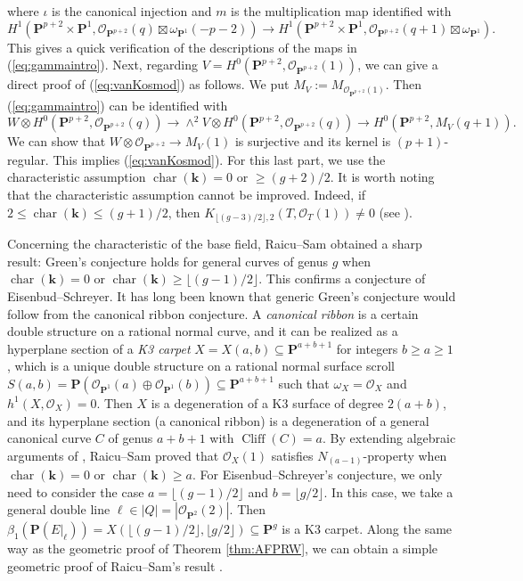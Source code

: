 \documentclass[graybox]{svmult}
\newcommand{\kk}{\mathbf{k}}
\newcommand{\sO}{\mathscr{O}}
\def\nP{\mathbf{P}}
\DeclareMathOperator{\Cliff}{Cliff}
\begin{document}
\noindent where $\iota$ is the canonical injection and $m$ is the multiplication map identified with
$$
H^1(\nP^{p+2} \times \nP^1, \sO_{\nP^{p+2}}(q) \boxtimes \omega_{\nP^1}(-p-2)) \longrightarrow H^1(\nP^{p+2} \times \nP^1, \sO_{\nP^{p+2}}(q+1) \boxtimes \omega_{\nP^1}).
$$
This gives a quick verification of the descriptions of the maps in (\ref{eq:gammaintro}). Next, regarding $V=H^0(\nP^{p+2}, \sO_{\nP^{p+2}}(1))$, we can give a direct proof of (\ref{eq:vanKosmod}) as follows.
We put $M_V:=M_{\sO_{\nP^{p+2}}(1)}$. Then (\ref{eq:gammaintro}) can be identified with
$$
W \otimes H^0(\nP^{p+2}, \sO_{\nP^{p+2}}(q)) \longrightarrow \wedge^2 V  \otimes H^0(\nP^{p+2}, \sO_{\nP^{p+2}}(q)) \longrightarrow H^0(\nP^{p+2}, M_V(q+1)).
$$
We can show that $W \otimes \sO_{\nP^{p+2}} \to M_V(1)$ is surjective and its kernel is $(p+1)$-regular. This implies (\ref{eq:vanKosmod}). For this last part, we use the characteristic assumption $\operatorname{char}(\kk) = 0$ or $\geq (g+2)/2$.
It is worth noting that the characteristic assumption cannot be improved. Indeed, if $2 \leq \operatorname{char}(\kk) \leq (g+1)/2$, then $K_{\lfloor (g-3)/2 \rfloor, 2}(T, \sO_T(1)) \neq 0$ (see \cite[Remark 5.17]{AFPRW}).

Concerning the characteristic of the base field, Raicu--Sam \cite[Theorem 1.5]{RS} obtained a sharp result: Green's conjecture holds for general curves of genus $g$ when $\operatorname{char}(\kk) = 0$ or $\operatorname{char}(\kk) \geq \lfloor(g-1)/2 \rfloor$. This confirms a conjecture of Eisenbud--Schreyer. 
It has long been known that generic Green's conjecture would follow from the canonical ribbon conjecture. A \emph{canonical ribbon} is a certain double structure on a rational normal curve, and it can be realized as a hyperplane section of a \emph{K3 carpet} $X=X(a,b) \subseteq \nP^{a+b+1}$ for integers $b \geq a \geq 1$, which is a unique double structure on a rational normal surface scroll $S(a,b)=\nP (\sO_{\nP^1}(a) \oplus \sO_{\nP^1}(b)) \subseteq \nP^{a+b+1}$ such that $\omega_X = \sO_X$ and $h^1(X, \sO_X)=0$. Then $X$ is a degeneration of a K3 surface of degree $2(a+b)$, and its hyperplane section (a canonical ribbon) is a degeneration of a general canonical curve $C$ of genus $a+b+1$ with $\Cliff(C) = a$. By extending algebraic arguments of \cite{AFPRW}, Raicu--Sam  \cite[Theorem 1.1]{RS} proved that $\sO_X(1)$ satisfies $N_{(a-1)}$-property when  $\operatorname{char}(\kk) = 0$ or $\operatorname{char}(\kk) \geq a$. For Eisenbud--Schreyer's conjecture, we only need to consider the case $a=\lfloor (g-1)/2 \rfloor$ and $b=\lfloor g/2 \rfloor$. In this case, we take a general double line $\ell \in |Q|=|\sO_{\nP^2}(2)|$. Then $\beta_1(\nP(E|_{\ell}))=X(\lfloor (g-1)/2 \rfloor, \lfloor g/2 \rfloor)  \subseteq \nP^g$ is a K3 carpet. Along the same way as the geometric proof of Theorem \ref{thm:AFPRW}, we can obtain a simple geometric proof of Raicu--Sam's result \cite[Theorem 1.1]{RS}. 
\end{document}
